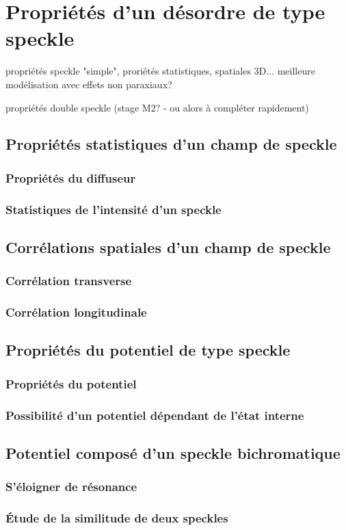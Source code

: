 \chapter{Propriétés d'un désordre de type speckle}


propriétés speckle "simple", proriétés statistiques, spatiales 3D...
meilleure modélisation avec effets non paraxiaux?

propriétés double speckle (stage M2? - ou alors à compléter rapidement)

\section{Propriétés statistiques d'un champ de speckle}
\subsection{Propriétés du diffuseur}
\subsection{Statistiques de l'intensité d'un speckle}

\section{Corrélations spatiales d'un champ de speckle}
\subsection{Corrélation transverse}
\subsection{Corrélation longitudinale}

\section{Propriétés du potentiel de type speckle}
\subsection{Propriétés du potentiel}
\subsection{Possibilité d'un potentiel dépendant de l'état interne}

\section{Potentiel composé d'un speckle bichromatique}
\subsection{S'éloigner de résonance}
\subsection{Étude de la similitude de deux speckles}